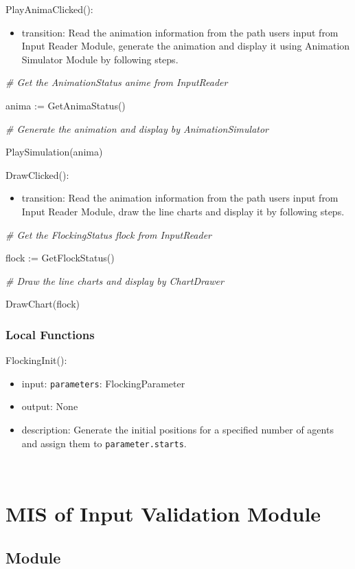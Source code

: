 \documentclass[12pt, titlepage]{article}
\begin{document}
\noindent PlayAnimaClicked():

\begin{itemize}
\item transition: Read the animation information from the path users input from 
Input Reader Module, generate the animation and display it using Animation 
Simulator Module by following steps. 
\end{itemize}
\textit{\# Get the AnimationStatus anime from InputReader}

anima :=  GetAnimaStatus()

\textit{\# Generate the animation and display by AnimationSimulator}

PlaySimulation(anima)

\vspace{2em}

\noindent DrawClicked():

\begin{itemize}
\item transition: Read the animation information from the path users input from 
Input Reader Module, draw the line charts and display it by following steps. 
\end{itemize}
\textit{\# Get the FlockingStatus flock from InputReader}

flock :=  GetFlockStatus()

\textit{\# Draw the line charts and display by ChartDrawer}

DrawChart(flock)

\subsubsection{Local Functions}
\noindent FlockingInit():
\begin{itemize}
\item input: \texttt{parameters}: FlockingParameter
\item output: None
\item description: Generate the initial positions for a specified number of 
agents and assign them to \texttt{parameter.starts}.
\end{itemize}

~\newpage

\section{MIS of Input Validation Module} \label{mIV}

\subsection{Module}
\end{document}
